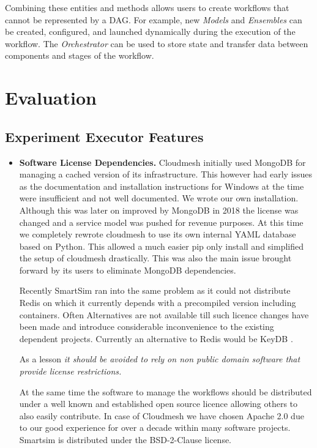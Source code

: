 \documentclass[utf8]{FrontiersinVancouver} %
\begin{document}
Combining these entities and methods allows users to create workflows that cannot be represented by a DAG. For example, new {\em Models} and {\em Ensembles} can be created, configured, and launched dynamically during the execution of the workflow. The {\em Orchestrator} can be used to store state and transfer data between components and stages of the workflow.



\section{Evaluation}

\subsection{Experiment Executor Features}



\begin{itemize}

\item {\bf Software License Dependencies.} Cloudmesh initially used MongoDB for managing a cached version of its infrastructure. This however had early issues as the documentation and installation instructions for Windows at the time were insufficient and not well documented. We wrote our own installation. Although this was later on improved by MongoDB in 2018 the license was changed and a service model was pushed for revenue purposes. At this time we completely rewrote cloudmesh to use its own internal YAML database based on Python. This allowed 
a much easier pip only install and simplified the setup of cloudmesh drastically. This was also the main issue brought forward by its users to eliminate MongoDB dependencies. 

Recently SmartSim ran into the same problem as it could not distribute Redis on which it currently depends with a precompiled version including containers. Often Alternatives are not available till such licence changes have been made and introduce considerable inconvenience to the existing dependent projects. Currently an alternative to Redis would be KeyDB  \citep{keydb}. 

As a lesson {\em it should be avoided to rely on non public domain software that provide license restrictions.}

At the same time the software to manage the workflows should be distributed under a well known and established open source licence allowing others to also easily contribute. In case of Cloudmesh we have chosen Apache 2.0 due to our good experience for over a decade within many software projects.
Smartsim is distributed under the BSD-2-Clause license.

\end{itemize}
\end{document}
